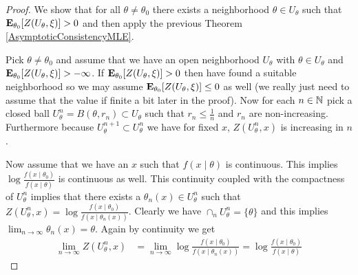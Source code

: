 \begin{proof}
We show that for all $\theta \neq \theta_0$ there exists a
neighborhood $\theta \in U_\theta$ such that
$\sexpectation{Z(U_\theta, \xi)}{\theta_0} > 0$ and then apply the
previous Theorem \ref{AsymptoticConsistencyMLE}.

Pick $\theta \neq \theta_0$ and assume that we have an open
neighborhood $U_\theta$ with $\theta \in U_\theta$ and $\sexpectation{Z(U_\theta, \xi)}{\theta_0} >
-\infty$.  If $\sexpectation{Z(U_\theta, \xi)}{\theta_0} > 0$ then
have found a suitable neighborhood so we may assume
$\sexpectation{Z(U_\theta, \xi)}{\theta_0} \leq 0$ as well (we really
just need to assume that the value if finite a bit later in the proof).  Now for each $n \in \naturals$ pick a closed ball $U^n_\theta =
B(\theta, r_n) \subset U_\theta$ such that $r_n \leq \frac{1}{n}$ and
$r_n$ are non-increasing.  Furthermore because $U^{n+1}_\theta \subset
U^n_\theta$ we have for fixed $x$, $Z(U^n_\theta, x)$ is increasing in
$n$.

Now assume that we have an $x$ such that $f(x \mid \theta)$ is
continuous.  This implies $\log \frac{f(x \mid \theta_0)}{f(x \mid
  \theta)}$ is continuous as well.  This continuity coupled with the
compactness of $U^n_\theta$ implies that there exists a $\theta_n(x)
\in U^n_\theta$ such that $Z(U^n_\theta, x) = \log \frac{f(x \mid \theta_0)}{f(x \mid
  \theta_n(x))}$.  Clearly we have $\cap_n U^n_\theta =
\lbrace \theta \rbrace$ and this implies $\lim_{n \to \infty}
\theta_n(x) = \theta$.  Again by continuity we get
\begin{align*}
\lim_{n \to \infty} Z(U^n_\theta, x) &= \lim_{n \to \infty}\log \frac{f(x \mid \theta_0)}{f(x \mid
  \theta_n(x))} = \log \frac{f(x \mid \theta_0)}{f(x \mid
  \theta)}
\end{align*}


\end{proof}
